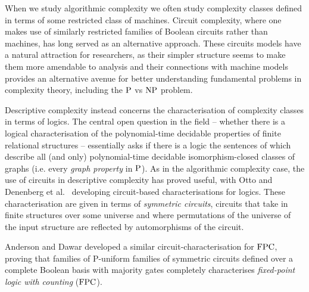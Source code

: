 \documentclass[../paper.tex]{subfiles}
\begin{document}
When we study algorithmic complexity we often study complexity classes defined
in terms of some restricted class of machines. Circuit complexity, where one
makes use of similarly restricted families of Boolean circuits rather than
machines, has long served as an alternative approach. These circuits models have
a natural attraction for researchers, as their simpler structure seems to make
them more amendable to analysis and their connections with machine models
provides an alternative avenue for better understanding fundamental problems in
complexity theory, including the $\mathrm{P}$ vs $\mathrm{NP}$ problem.

Descriptive complexity instead concerns the characterisation of complexity
classes in terms of logics. The central open question in the field -- whether
there is a logical characterisation of the polynomial-time decidable properties
of finite relational structures -- essentially asks if there is a logic the
sentences of which describe all (and only) polynomial-time decidable
isomorphism-closed classes of graphs (i.e. every \emph{graph property} in
$\mathrm{P}$). As in the algorithmic complexity case, the use of circuits in
descriptive complexity has proved useful, with Otto \cite{Otto1997} and
Denenberg et al.~\cite{DENENBERG1986216} developing circuit-based
characterisations for logics. These characterisation are given in terms of
\emph{symmetric circuits}, circuits that take in finite structures over some
universe and where permutations of the universe of the input structure are
reflected by automorphisms of the circuit.


Anderson and Dawar \cite{AndersonD17} developed a similar
circuit-characterisation for $\text{\upshape FPC}$, proving that families of P-uniform families
of symmetric circuits defined over a complete Boolean basis with majority gates
completely characterises \emph{fixed-point logic with counting} ($\text{\upshape FPC}$).
\end{document}
